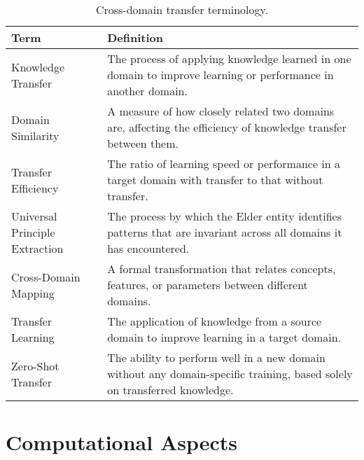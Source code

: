 \begin{table}[h]
\centering
\begin{tabular}{|l|p{12cm}|}
\hline
\textbf{Term} & \textbf{Definition} \\
\hline
Knowledge Transfer & The process of applying knowledge learned in one domain to improve learning or performance in another domain. \\
\hline
Domain Similarity & A measure of how closely related two domains are, affecting the efficiency of knowledge transfer between them. \\
\hline
Transfer Efficiency & The ratio of learning speed or performance in a target domain with transfer to that without transfer. \\
\hline
Universal Principle Extraction & The process by which the Elder entity identifies patterns that are invariant across all domains it has encountered. \\
\hline
Cross-Domain Mapping & A formal transformation that relates concepts, features, or parameters between different domains. \\
\hline
Transfer Learning & The application of knowledge from a source domain to improve learning in a target domain. \\
\hline
Zero-Shot Transfer & The ability to perform well in a new domain without any domain-specific training, based solely on transferred knowledge. \\
\hline
\end{tabular}
\caption{Cross-domain transfer terminology.}
\label{tab:transfer_terminology}
\end{table}

\section{Computational Aspects}

